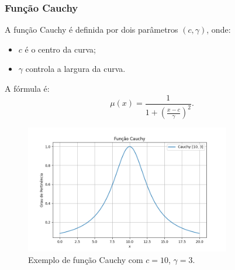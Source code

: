 \documentclass[a4paper,12pt]{article}
\begin{document}
\subsubsection{Função Cauchy}
A função Cauchy é definida por dois parâmetros $(c, \gamma)$, onde:
\begin{itemize}
    \item $c$ é o centro da curva;
    \item $\gamma$ controla a largura da curva.
\end{itemize}
A fórmula é:
\[
\mu(x) = \frac{1}{1 + \left(\frac{x - c}{\gamma}\right)^2}.
\]
\begin{figure}[H]
    \centering
    \includegraphics[width=0.8\textwidth]{img/cauchy.png}
    \caption{Exemplo de função Cauchy com $c=10$, $\gamma=3$.}
\end{figure}
\end{document}
